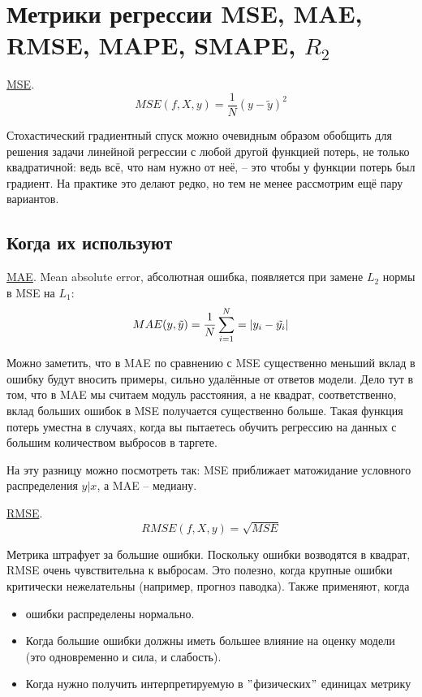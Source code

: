 \documentclass[a4paper, 14pt]{article}
\begin{document}
    \section{Метрики регрессии MSE, MAE, RMSE, MAPE, SMAPE, $R_2$}
    
    \underline{MSE}.
    \[ MSE(f,X,y) = \frac{1}{N} (y - \tilde{y})^2 \]
    
    Стохастический градиентный спуск можно очевидным образом обобщить для решения задачи линейной регрессии с любой
    другой функцией потерь, не только квадратичной: ведь всё, что нам нужно от неё, -- это чтобы у функции потерь был
    градиент.
    На практике это делают редко, но тем не менее рассмотрим ещё пару вариантов.
    
    \subsection{Когда их используют}
    
    \underline{MAE}.
    Mean absolute error, абсолютная ошибка, появляется при замене $L_2$ нормы в MSE на $L_1$:
    \[ MAE(y,\tilde{y}) = \frac{1}{N} \sum_{i=1}^N = \abs{y_i - \tilde{y_i}} \]
    
    Можно заметить, что в MAE по сравнению с MSE существенно меньший вклад в ошибку будут вносить примеры, сильно
    удалённые от ответов модели.
    Дело тут в том, что в MAE мы считаем модуль расстояния, а не квадрат, соответственно, вклад больших ошибок в MSE
    получается существенно больше.
    Такая функция потерь уместна в случаях, когда вы пытаетесь обучить регрессию на данных с большим количеством
    выбросов в таргете.
    
    На эту разницу можно посмотреть так: MSE приближает матожидание условного распределения $y|x$, а MAE -- медиану.
    
    \underline{RMSE}.
    \[ RMSE(f,X,y) = \sqrt{MSE} \]
    
    Метрика штрафует за большие ошибки.
    Поскольку ошибки возводятся в квадрат, RMSE очень чувствительна к выбросам.
    Это полезно, когда крупные ошибки критически нежелательны (например, прогноз паводка).
    Также применяют, когда
    \begin{itemize}
        \item ошибки распределены нормально.
        \item Когда большие ошибки должны иметь большее влияние на оценку модели (это одновременно и сила, и слабость).
        \item Когда нужно получить интерпретируемую в \("\)физических\("\) единицах метрику
    \end{itemize}
    
\end{document}
